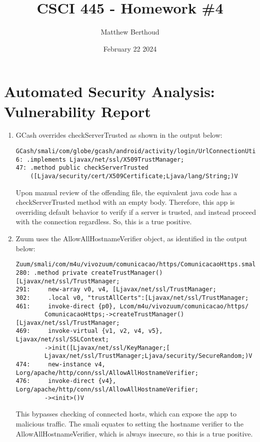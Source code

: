 \documentclass[11pt]{article}
\title{CSCI 445 - Homework \#4}
\author{Matthew Berthoud}
\date{February 22 2024}
\begin{document}
\maketitle

\section{Automated Security Analysis: Vulnerability Report}

\begin{enumerate}
    \item
        GCash overrides checkServerTrusted as shown in the output below:
\begin{verbatim}
GCash/smali/com/globe/gcash/android/activity/login/UrlConnectionUtil$1.smali
6: .implements Ljavax/net/ssl/X509TrustManager;
47: .method public checkServerTrusted
    ([Ljava/security/cert/X509Certificate;Ljava/lang/String;)V
\end{verbatim}
        Upon manual review of the offending file, the equivalent java code has a checkServerTrusted method with an empty body. Therefore, this app is overriding default behavior to verify if a server is trusted, and instead proceed with the connection regardless. So, this is a true positive.

    \item 
        Zuum uses the AllowAllHostnameVerifier object, as identified in the output below:
\begin{verbatim}
Zuum/smali/com/m4u/vivozuum/comunicacao/https/ComunicacaoHttps.smali
280: .method private createTrustManager()[Ljavax/net/ssl/TrustManager;
291:     new-array v0, v4, [Ljavax/net/ssl/TrustManager;
302:     .local v0, "trustAllCerts":[Ljavax/net/ssl/TrustManager;
461:     invoke-direct {p0}, Lcom/m4u/vivozuum/comunicacao/https/
        ComunicacaoHttps;->createTrustManager()[Ljavax/net/ssl/TrustManager;
469:     invoke-virtual {v1, v2, v4, v5}, Ljavax/net/ssl/SSLContext;
        ->init([Ljavax/net/ssl/KeyManager;[
        Ljavax/net/ssl/TrustManager;Ljava/security/SecureRandom;)V
474:     new-instance v4, Lorg/apache/http/conn/ssl/AllowAllHostnameVerifier;
476:     invoke-direct {v4}, Lorg/apache/http/conn/ssl/AllowAllHostnameVerifier;
        -><init>()V
\end{verbatim}
        This bypasses checking of connected hosts, which can expose the app to malicious traffic. The smali equates to setting the hostname verifier to the AllowAllHostnameVerifier, which is always insecure, so this is a true positive.



\end{enumerate}
\end{document}
